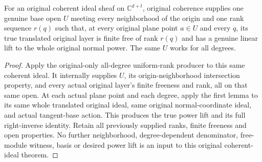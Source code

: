 \begin{theorem}
\label{hir:relative-normal-original-nearby-all-power-lifts}
\leanok
For an original coherent ideal sheaf on $\mathbb C^{d+t}$, original
coherence supplies one genuine base open $U$ meeting every neighborhood
of the origin and one rank sequence $r(q)$ such that, at every original
plane point $a\in U$ and every $q$, its true translated original layer
is finite free of rank $r(q)$ and has a genuine linear lift to the
whole original normal power. The same $U$ works for all degrees.
\end{theorem}
\begin{proof}
Apply the original-only all-degree uniform-rank producer to this
same coherent ideal. It internally supplies $U$, its origin-neighborhood
intersection property, and every actual original layer's finite
freeness and rank, all on that same open. At each actual plane point
and each degree, apply the first lemma to its same whole translated
original ideal, same original normal-coordinate ideal, and actual
tangent-base action. This produces the true power lift and its full
right-inverse identity. Retain all previously supplied ranks, finite
freeness and open properties. No further neighborhood, degree-dependent
denominator, free-module witness, basis or desired power lift is an
input to this original coherent-ideal theorem.
\end{proof}
